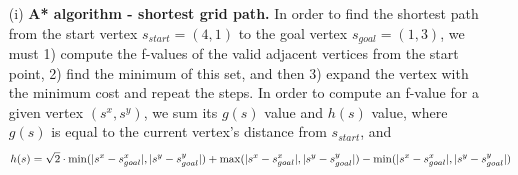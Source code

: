 \documentclass[12pt]{article}
\begin{document}
\begin{enumerate}[label=(\alph*)]
  \begin{enumerate}
  
      \item[(i)] \textbf{A* algorithm - shortest grid path.} In order to find the shortest path from the start vertex $s_{start} = (4,1)$ to the goal vertex $s_{goal} = (1,3)$, we must 1) compute the f-values of the valid adjacent vertices from the start point, 2) find the minimum of this set, and then 3) expand the vertex with the minimum cost and repeat the steps. In order to compute an f-value for a given vertex $(s^x, s^y)$, we sum its $g(s)$ value and $h(s)$ value, where $g(s)$ is equal to the current vertex's distance from $s_{start}$, and 
      \begin{equation}
          \scriptsize h(s) = \sqrt{2}\cdot\min(|s^x - s_{goal}^x|,|s^y - s_{goal}^y|) + \max(|s^x - s_{goal}^x|,|s^y - s_{goal}^y|) - \min(|s^x - s_{goal}^x|,|s^y - s_{goal}^y|)
      \end{equation}
      

\end{enumerate}
\end{enumerate}
\end{document}
